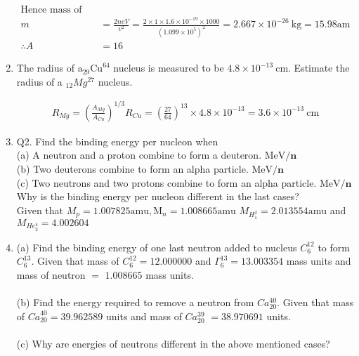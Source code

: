 \begin{enumerate}
\begin{answer}
\begin{align*}
		\text{Hence mass of ion}\\
		m&=\frac{2 n e V}{v^2}=\frac{2 \times 1 \times 1.6 \times 10^{-19} \times 1000}{\left(1.099 \times 10^5\right)^2}=2.667 \times 10^{-26} \mathrm{~kg}=15.98 \mathrm{am} \\
		\therefore A&=16
		\end{align*}
	\end{answer}
	\item  The radius of $\mathrm{a}_{29} \mathrm{Cu}^{64}$ nucleus is measured to be $4.8 \times 10^{-13} \mathrm{~cm}$. Estimate the radius of a ${ }_{12} M g^{27}$ nucleus.
	\begin{answer}
		\begin{align*}
		R_{M g}=\left(\frac{A_{M g}}{A_{C u}}\right)^{1 / 3} R_{C u}=\left(\frac{27}{64}\right)^{13} \times 4.8 \times 10^{-13}=3.6 \times 10^{-13} \mathrm{~cm}
		\end{align*}
	\end{answer}


	\item Q2. Find the binding energy per nucleon when\\
	(a) A neutron and a proton combine to form a deuteron. $\mathrm{MeV} / \mathbf{n}$\\
	(b) Two deuterons combine to form an alpha particle. $\mathrm{MeV} / \mathbf{n}$\\
	(c) Two neutrons and two protons combine to form an alpha particle. $\mathrm{MeV} / \mathbf{n}$\\
	Why is the binding energy per nucleon different in the last cases?\\
	Given that $M_p=1.007825 \mathrm{amu}, \mathrm{M}_{n}=1.008665 \mathrm{amu}$
	$M_{H_1^2}=2.013554 \mathrm{amu}$ and $M_{He_2^4}=4.002604$

	\item  (a) Find the binding energy of one last neutron added to nucleus ${C}_6^{12}$ to form ${C}_6^{13}$. Given that mass of $C_{6}^{12}=12.000000$ and $\Gamma_6^{13}=13.003354$ mass units and mass of neutron $=$ $1.008665$ mass units.\\\\
	(b) Find the energy required to remove a neutron from $C a_{20}^{40}$. Given that mass of ${Ca}_{20}^{40}=39.962589$ units and mass of $C a_{20}^{39}$ $=38.970691$ units.\\\\
	(c) Why are energies of neutrons different in the above mentioned cases?
	
	
	
	
\end{enumerate}




